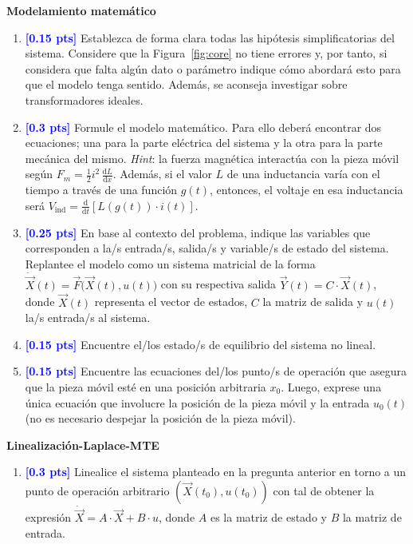 \documentclass[
  11pt,
  letterpaper,
   addpoints,
   answers
  ]{exam}
\begin{document}
\begin{questions}
\question \textbf{Modelamiento matemático}
\begin{enumerate}
  \item \textcolor{blue}{\textbf{[0.15 pts]}} Establezca de forma clara todas las hipótesis simplificatorias del sistema. Considere que la Figura~\ref{fig:core} no tiene errores y, por tanto, si considera que falta algún dato o parámetro indique cómo abordará esto para que el modelo tenga sentido. Además, se aconseja investigar sobre transformadores ideales.

  \item \textcolor{blue}{\textbf{[0.3 pts]}} Formule el modelo matemático. Para ello deberá encontrar dos ecuaciones; una para la parte eléctrica del sistema y la otra para la parte mecánica del mismo. \emph{Hint}: la fuerza magnética interactúa con la pieza móvil según $F_m = \frac{1}{2} i^2\, \frac{\mathrm{d}L}{\mathrm{d}x}$. Además, si el valor $L$ de una inductancia varía con el tiempo a través de una función $g(t)$, entonces, el voltaje en esa inductancia será $V_{\text{ind}} = \frac{\mathrm{d}}{\mathrm{d}t}\left[L(g(t)) \cdot i(t)\right]$.

  \item \textcolor{blue}{\textbf{[0.25 pts]}} En base al contexto del problema, indique las variables que corresponden a la/s entrada/s, salida/s y variable/s de estado del sistema. Replantee el modelo como un sistema matricial de la forma $\dot{\vec{X}}(t) = \vec{F}\big(\vec{X}(t), u(t)\big)$ con su respectiva salida $\vec{Y}(t) = C \cdot \vec{X}(t)$, donde $\vec{X}(t)$ representa el vector de estados, $C$ la matriz de salida y $u(t)$ la/s entrada/s al sistema.

  \item \textcolor{blue}{\textbf{[0.15 pts]}} Encuentre el/los estado/s de equilibrio del sistema no lineal.

  \item \textcolor{blue}{\textbf{[0.15 pts]}} Encuentre las ecuaciones del/los punto/s de operación que asegura que la pieza móvil esté en una posición arbitraria $x_0$. Luego, exprese una única ecuación que involucre la posición de la pieza móvil y la entrada $u_0(t)$ (no es necesario despejar la posición de la pieza móvil).
\end{enumerate}

\question \textbf{Linealización-Laplace-MTE}

\begin{enumerate}
  \item \textcolor{blue}{\textbf{[0.3 pts]}} Linealice el sistema planteado en la pregunta anterior en torno a un punto de operación arbitrario $(\vec{X}(t_0), u(t_0))$ con tal de obtener la expresión $\dot{\vec{X}} = A \cdot \vec{X} + B \cdot u$, donde $A$ es la matriz de estado y $B$ la matriz de entrada.


\end{enumerate}
\end{questions}
\end{document}
